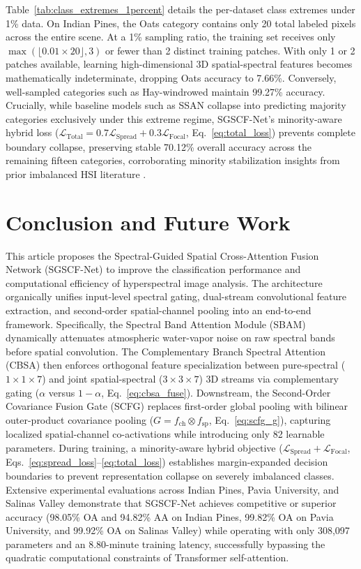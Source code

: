 \documentclass[manuscript,screen,review]{acmart}
\begin{document}
Table~\ref{tab:class_extremes_1percent} details the per-dataset class extremes under 1\% data. On Indian Pines, the Oats category contains only 20 total labeled pixels across the entire scene. At a 1\% sampling ratio, the training set receives only $\max(\lfloor 0.01 \times 20 \rfloor, 3)$ or fewer than 2 distinct training patches. With only 1 or 2 patches available, learning high-dimensional 3D spatial-spectral features becomes mathematically indeterminate, dropping Oats accuracy to 7.66\%. Conversely, well-sampled categories such as Hay-windrowed maintain 99.27\% accuracy. Crucially, while baseline models such as SSAN collapse into predicting majority categories exclusively under this extreme regime, SGSCF-Net's minority-aware hybrid loss ($\mathcal{L}_{\text{Total}} = 0.7 \mathcal{L}_{\text{Spread}} + 0.3 \mathcal{L}_{\text{Focal}}$, Eq.~\ref{eq:total_loss}) prevents complete boundary collapse, preserving stable 70.12\% overall accuracy across the remaining fifteen categories, corroborating minority stabilization insights from prior imbalanced HSI literature \cite{cui2019class, haut2021generative, su2023spectral}.

\newpage
\section{Conclusion and Future Work}
\label{sec:conclusion}
This article proposes the Spectral-Guided Spatial Cross-Attention Fusion Network (SGSCF-Net) to improve the classification performance and computational efficiency of hyperspectral image analysis. The architecture organically unifies input-level spectral gating, dual-stream convolutional feature extraction, and second-order spatial-channel pooling into an end-to-end framework. Specifically, the Spectral Band Attention Module (SBAM) dynamically attenuates atmospheric water-vapor noise on raw spectral bands before spatial convolution. The Complementary Branch Spectral Attention (CBSA) then enforces orthogonal feature specialization between pure-spectral ($1\times 1\times 7$) and joint spatial-spectral ($3\times 3\times 7$) 3D streams via complementary gating ($\alpha$ versus $1-\alpha$, Eq.~\ref{eq:cbsa_fuse}). Downstream, the Second-Order Covariance Fusion Gate (SCFG) replaces first-order global pooling with bilinear outer-product covariance pooling ($G = f_{\text{ch}} \otimes f_{\text{sp}}$, Eq.~\ref{eq:scfg_g}), capturing localized spatial-channel co-activations while introducing only 82 learnable parameters. During training, a minority-aware hybrid objective ($\mathcal{L}_{\text{Spread}} + \mathcal{L}_{\text{Focal}}$, Eqs.~\ref{eq:spread_loss}--\ref{eq:total_loss}) establishes margin-expanded decision boundaries to prevent representation collapse on severely imbalanced classes. Extensive experimental evaluations across Indian Pines, Pavia University, and Salinas Valley demonstrate that SGSCF-Net achieves competitive or superior accuracy (98.05\% OA and 94.82\% AA on Indian Pines, 99.82\% OA on Pavia University, and 99.92\% OA on Salinas Valley) while operating with only 308,097 parameters and an 8.80-minute training latency, successfully bypassing the quadratic computational constraints of Transformer self-attention.
\end{document}
